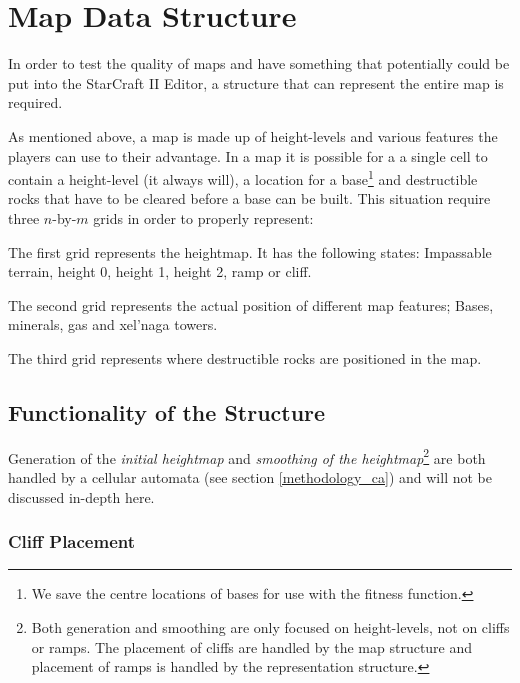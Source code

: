 \section{Map Data Structure}
\label{methodology_mapstructure}

In order to test the quality of maps and have something that potentially could be put into the StarCraft II Editor, a structure that can represent the entire map is required.

As mentioned above, a map is made up of height-levels and various features the players can use to their advantage. In a map it is possible for a a single cell to contain a height-level (it always will), a location for a base\footnote{We save the centre locations of bases for use with the fitness function.} and destructible rocks that have to be cleared before a base can be built. This situation require three $n$-by-$m$ grids in order to properly represent:

\begin{my_itemize}

	\item The first grid represents the heightmap. It has the following states: Impassable terrain, height 0, height 1, height 2, ramp or cliff.

	\item The second grid represents the actual position of different map features; Bases, minerals, gas and xel'naga towers.

	\item The third grid represents where destructible rocks are positioned in the map.

\end{my_itemize}

\subsection{Functionality of the Structure}
\label{methodology_mapstructure_functionality}

Generation of the \textit{initial heightmap} and \textit{smoothing of the heightmap}\footnote{Both generation and smoothing are only focused on height-levels, not on cliffs or ramps. The placement of cliffs are handled by the map structure and placement of ramps is handled by the representation structure.} are both handled by a cellular automata (see section \ref{methodology_ca}) and will not be discussed in-depth here.

\subsubsection*{Cliff Placement}


